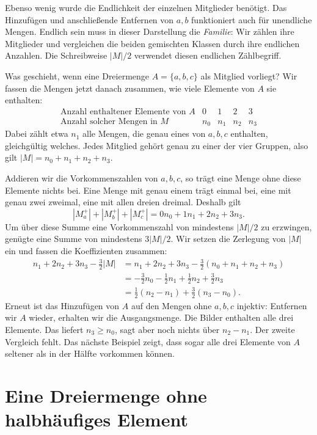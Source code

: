 Ebenso wenig wurde die Endlichkeit der einzelnen Mitglieder
benötigt. Das Hinzufügen und anschließende Entfernen von
\(a,b\) funktioniert auch für unendliche Mengen.
Endlich sein muss in dieser Darstellung die \emph{Familie}:
Wir zählen ihre Mitglieder und vergleichen die beiden
gemischten Klassen durch ihre endlichen Anzahlen.
Die Schreibweise \(|M|/2\) verwendet diesen endlichen
Zählbegriff.

Was geschieht, wenn eine Dreiermenge \(A=\{a,b,c\}\)
als Mitglied vorliegt? Wir fassen die Mengen jetzt danach
zusammen, wie viele Elemente von \(A\) sie enthalten:
\[
  \begin{array}{c|cccc}
    \text{Anzahl enthaltener Elemente von }A & 0 & 1 & 2 & 3\\
    \text{Anzahl solcher Mengen in }M       & n_0 & n_1 & n_2 & n_3
  \end{array}
\]
Dabei zählt etwa \(n_1\) alle Mengen, die genau eines von
\(a,b,c\) enthalten, gleichgültig welches. Jedes Mitglied
gehört genau zu einer der vier Gruppen, also gilt
\(|M|=n_0+n_1+n_2+n_3\).

Addieren wir die Vorkommenszahlen von \(a,b,c\), so trägt
eine Menge ohne diese Elemente nichts bei. Eine Menge mit
genau einem trägt einmal bei, eine mit genau zwei zweimal,
eine mit allen dreien dreimal. Deshalb gilt
\[
  |M_a^+|+|M_b^+|+|M_c^+|=0n_0+1n_1+2n_2+3n_3.
\]
Um über diese Summe eine Vorkommenszahl von mindestens
\(|M|/2\) zu erzwingen, genügte eine Summe von mindestens
\(3|M|/2\). Wir setzen die Zerlegung von \(|M|\) ein
und fassen die Koeffizienten zusammen:
\[
  \begin{aligned}
    n_1+2n_2+3n_3-\frac32|M|
      &=n_1+2n_2+3n_3-\frac32(n_0+n_1+n_2+n_3)\\
      &=-\frac32n_0-\frac12n_1+\frac12n_2+\frac32n_3\\
      &=\frac12(n_2-n_1)+\frac32(n_3-n_0).
  \end{aligned}
\]
Erneut ist das Hinzufügen von \(A\) auf den Mengen ohne
\(a,b,c\) injektiv: Entfernen wir \(A\) wieder, erhalten
wir die Ausgangsmenge. Die Bilder enthalten alle drei
Elemente. Das liefert \(n_3\geq n_0\), sagt aber noch
nichts über \(n_2-n_1\). Der zweite Vergleich fehlt.
Das nächste Beispiel zeigt, dass sogar alle drei Elemente
von \(A\) seltener als in der Hälfte vorkommen können.

\par{}
\section*{Eine Dreiermenge ohne halbhäufiges Element}
\hypertarget{frankl.reading.rare-triple}{}
\hypertarget{frankl.reading.triple-example}{}

